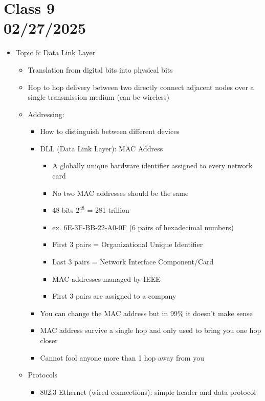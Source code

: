 \documentclass{article}
\begin{document}
\section*{Class 9 \\ 02/27/2025}\label{sec:Class 9}
\begin{itemize}
    \item Topic 6: Data Link Layer
    \begin{itemize}
        \item Translation from digital bits into physical bits
        \item Hop to hop delivery between two directly connect adjacent nodes over a single transmission medium (can be wireless)
        \item Addressing:
        \begin{itemize}
            \item How to distinguish between different devices
            \item DLL (Data Link Layer): MAC Address
            \begin{itemize}
                \item A globally unique hardware identifier assigned to every network card
                \item No two MAC addresses should be the same
                \item 48 bits \(2^{48}\) = 281 trillion
                \item ex. 6E-3F-BB-22-A0-0F (6 pairs of hexadecimal numbers)
                \item First 3 pairs = Organizational Unique Identifier
                \item Last 3 pairs = Network Interface Component/Card
                \item MAC addresses managed by IEEE
                \item First 3 pairs are  assigned to a company
            \end{itemize}
            \item You can change the MAC address but in 99\% it doesn't make sense
            \item MAC address survive a single hop and only used to bring you one hop closer
            \item Cannot fool anyone more than 1 hop away from you
        \end{itemize}
    \item Protocols
    \begin{itemize}
        \item 802.3 Ethernet (wired connections): simple header and data protocol

\end{itemize}
\end{itemize}
\end{itemize}
\end{document}
